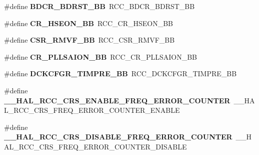 \begin{DoxyCompactItemize}
\#define {\bfseries B\+D\+C\+R\+\_\+\+B\+D\+R\+S\+T\+\_\+\+BB}~R\+C\+C\+\_\+\+B\+D\+C\+R\+\_\+\+B\+D\+R\+S\+T\+\_\+\+BB
\item 
\mbox{\label{group___h_a_l___r_c_c___aliased_ga08230c355dd58b92f14444c65521e248}} 
\#define {\bfseries C\+R\+\_\+\+H\+S\+E\+O\+N\+\_\+\+BB}~R\+C\+C\+\_\+\+C\+R\+\_\+\+H\+S\+E\+O\+N\+\_\+\+BB
\item 
\mbox{\label{group___h_a_l___r_c_c___aliased_ga69d10c519fec30b0177c26dbf7d44e02}} 
\#define {\bfseries C\+S\+R\+\_\+\+R\+M\+V\+F\+\_\+\+BB}~R\+C\+C\+\_\+\+C\+S\+R\+\_\+\+R\+M\+V\+F\+\_\+\+BB
\item 
\mbox{\label{group___h_a_l___r_c_c___aliased_gab84e7d3874237ee56e5cb3a26644cd13}} 
\#define {\bfseries C\+R\+\_\+\+P\+L\+L\+S\+A\+I\+O\+N\+\_\+\+BB}~R\+C\+C\+\_\+\+C\+R\+\_\+\+P\+L\+L\+S\+A\+I\+O\+N\+\_\+\+BB
\item 
\mbox{\label{group___h_a_l___r_c_c___aliased_gaff212f4f5168f26347acf1abbb331961}} 
\#define {\bfseries D\+C\+K\+C\+F\+G\+R\+\_\+\+T\+I\+M\+P\+R\+E\+\_\+\+BB}~R\+C\+C\+\_\+\+D\+C\+K\+C\+F\+G\+R\+\_\+\+T\+I\+M\+P\+R\+E\+\_\+\+BB
\item 
\mbox{\label{group___h_a_l___r_c_c___aliased_gae1dcfa2b4d26da3bd30866860476fe97}} 
\#define {\bfseries \+\_\+\+\_\+\+H\+A\+L\+\_\+\+R\+C\+C\+\_\+\+C\+R\+S\+\_\+\+E\+N\+A\+B\+L\+E\+\_\+\+F\+R\+E\+Q\+\_\+\+E\+R\+R\+O\+R\+\_\+\+C\+O\+U\+N\+T\+ER}~\+\_\+\+\_\+\+H\+A\+L\+\_\+\+R\+C\+C\+\_\+\+C\+R\+S\+\_\+\+F\+R\+E\+Q\+\_\+\+E\+R\+R\+O\+R\+\_\+\+C\+O\+U\+N\+T\+E\+R\+\_\+\+E\+N\+A\+B\+LE
\item 
\mbox{\label{group___h_a_l___r_c_c___aliased_ga4fde79e50cae4f2d38db5c547037b84b}} 
\#define {\bfseries \+\_\+\+\_\+\+H\+A\+L\+\_\+\+R\+C\+C\+\_\+\+C\+R\+S\+\_\+\+D\+I\+S\+A\+B\+L\+E\+\_\+\+F\+R\+E\+Q\+\_\+\+E\+R\+R\+O\+R\+\_\+\+C\+O\+U\+N\+T\+ER}~\+\_\+\+\_\+\+H\+A\+L\+\_\+\+R\+C\+C\+\_\+\+C\+R\+S\+\_\+\+F\+R\+E\+Q\+\_\+\+E\+R\+R\+O\+R\+\_\+\+C\+O\+U\+N\+T\+E\+R\+\_\+\+D\+I\+S\+A\+B\+LE
\item 
\mbox{\label{group___h_a_l___r_c_c___aliased_ga5995b6b81fd33e5ea35834afb5869f1e}} 

\end{DoxyCompactItemize}
